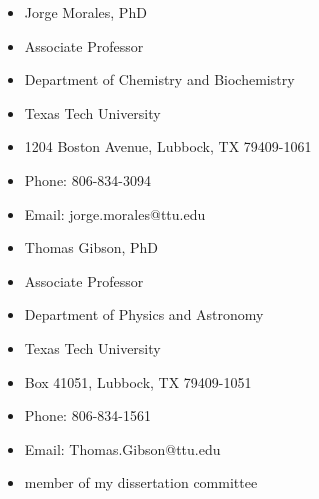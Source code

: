\documentclass[
]{article}
\providecommand{\tightlist}{%
  \setlength{\itemsep}{0pt}\setlength{\parskip}{0pt}}
\begin{document}
\begin{itemize}
\tightlist
\item
  Jorge Morales, PhD
\item
  Associate Professor
\item
  Department of Chemistry and Biochemistry
\item
  Texas Tech University
\item
  1204 Boston Avenue, Lubbock, TX 79409-1061
\item
  Phone: 806-834-3094
\item
  Email: jorge.morales@ttu.edu
\end{itemize}

\begin{itemize}
\tightlist
\item
  Thomas Gibson, PhD
\item
  Associate Professor
\item
  Department of Physics and Astronomy
\item
  Texas Tech University
\item
  Box 41051, Lubbock, TX 79409-1051
\item
  Phone: 806-834-1561
\item
  Email: Thomas.Gibson@ttu.edu
\item
  member of my dissertation committee
\end{itemize}
\end{document}
